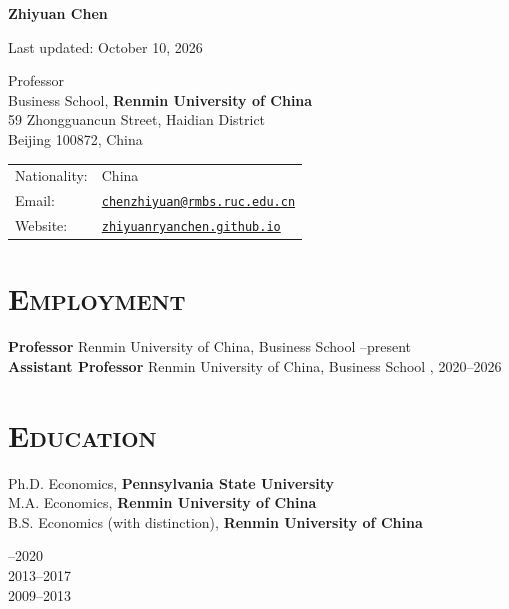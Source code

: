 \documentclass[letterpaper]{article}
\def\name{Zhiyuan Chen}
\begin{document}
\centerline{\huge \bf \name}

\vspace{1ex}

\begin{center}
{\scriptsize Last updated: October 10, 2026}
\end{center}

\vspace{0.2in}

\normalsize

\begin{minipage}{0.55\linewidth}
 Professor \\
  Business School, \textbf{Renmin University of China} \\
  59 Zhongguancun Street, Haidian District \\
  Beijing 100872, China
\end{minipage}
\begin{minipage}{0.45\linewidth}
  \begin{tabular}{ll}
    Nationality: & China \\
    Email: & \href{mailto:chenzhiyuan@rmbs.ruc.edu.cn}{\tt chenzhiyuan@rmbs.ruc.edu.cn} \\
    Website: & \href{https://zhiyuanryanchen.github.io/}{\tt zhiyuanryanchen.github.io} \\
  \end{tabular}
\end{minipage}

\section*{\textsc{Employment}}
\textbf{Professor}  Renmin University of China, Business School --present \\
\textbf{Assistant Professor} Renmin University of China, Business School \quad
, 2020--2026

\section*{\textsc{Education}}
\begin{minipage}{0.7\textwidth}
 Ph.D. Economics, \textbf{Pennsylvania State University}\\
 M.A. Economics, \textbf{Renmin University of China}  \\
 B.S. Economics (with distinction), \textbf{Renmin University of China}
\end{minipage}
\begin{minipage}{0.3\textwidth}
  --2020 \\
  2013--2017 \\
  2009--2013
\end{minipage}
\end{document}
